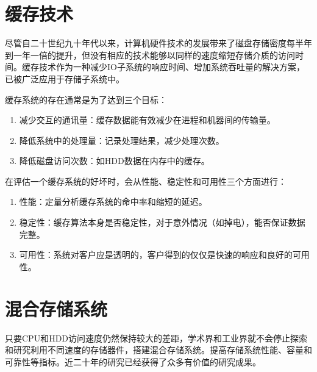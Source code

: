 \section{缓存技术}
\label{sec:cache_tech}

尽管自二十世纪九十年代以来，计算机硬件技术的发展带来了磁盘存储密度每半年到一年一倍的提升，但没有相应的技术能够以同样的速度缩短存储介质的访问时间。缓存技术作为一种减少IO子系统的响应时间、增加系统吞吐量的解决方案，已被广泛应用于存储子系统中。

缓存系统的存在通常是为了达到三个目标：
\begin{enumerate}
\item 减少交互的通讯量：缓存数据能有效减少在进程和机器间的传输量。
\item 降低系统中的处理量：记录处理结果，减少处理次数。
\item 降低磁盘访问次数：如HDD数据在内存中的缓存。
\end{enumerate}

在评估一个缓存系统的好坏时，会从性能、稳定性和可用性三个方面进行：
\begin{enumerate}
\item 性能：定量分析缓存系统的命中率和缩短的延迟。
\item 稳定性：缓存算法本身是否稳定性，对于意外情况（如掉电），能否保证数据完整。
\item 可用性：系统对客户应是透明的，客户得到的仅仅是快速的响应和良好的可用性。
\end{enumerate}

\section{混合存储系统}
\label{sec:hybrid_storage}

只要CPU和HDD访问速度仍然保持较大的差距，学术界和工业界就不会停止探索和研究利用不同速度的存储器件，搭建混合存储系统。提高存储系统性能、容量和可靠性等指标。近二十年的研究已经获得了众多有价值的研究成果。

